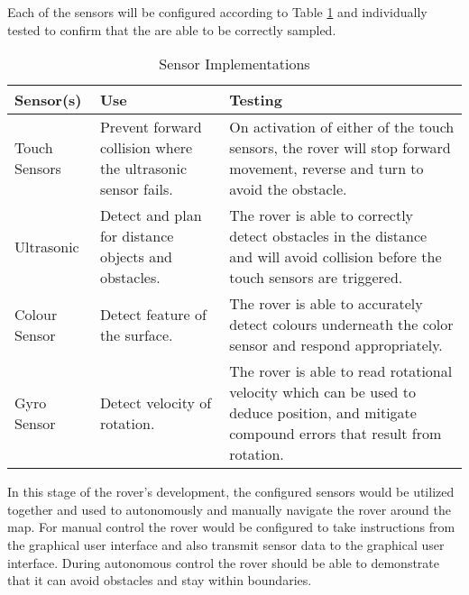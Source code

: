 \documentclass{article}
\newcounter{subsubsubsection}[subsubsection]
\begin{document}
    \begin{adjustwidth}{3em}{0pt}
    Each of the sensors will be configured according to Table \ref{table:Sensor Implementations} and individually tested to confirm that the are able to be correctly sampled. 
    
    \begin{table}[H]
    \begin{adjustwidth}{3em}{0pt}
\caption{Sensor Implementations\label{table:Sensor Implementations}}
\begin{tabularx}{\linewidth}{|l|X|X|}
\hline
\textbf{Sensor(s)} & \textbf{Use}                                                 & \textbf{Testing}                                                                                                                            \\ \hline
Touch Sensors      & Prevent forward collision where the ultrasonic sensor fails. & On activation of either of the touch sensors, the rover will stop forward movement, reverse and turn to avoid the obstacle.                 \\ \hline
Ultrasonic         & Detect and plan for distance objects and obstacles.          & The rover is able to correctly detect obstacles in the distance and will avoid collision before the touch sensors are triggered.            \\ \hline
Colour Sensor      & Detect feature of the surface.                               & The rover is able to accurately detect colours underneath the color sensor and respond appropriately.                                       \\ \hline
Gyro Sensor        & Detect velocity of rotation.                                 & The rover is able to read rotational velocity which can be used to deduce position, and mitigate compound errors that result from rotation. \\ \hline
\end{tabularx}
\end{adjustwidth}
\end{table}
    \end{adjustwidth}
    
    \begin{adjustwidth}{3em}{0pt}
    In this stage of the rover's development, the configured sensors would be utilized together and used to autonomously and manually navigate the rover around the map. For manual control the rover would be configured to take instructions from the graphical user interface and also transmit sensor data to the graphical user interface. During autonomous control the rover should be able to demonstrate that it can avoid obstacles and stay within boundaries.
   \end{adjustwidth}
   
\end{document}
